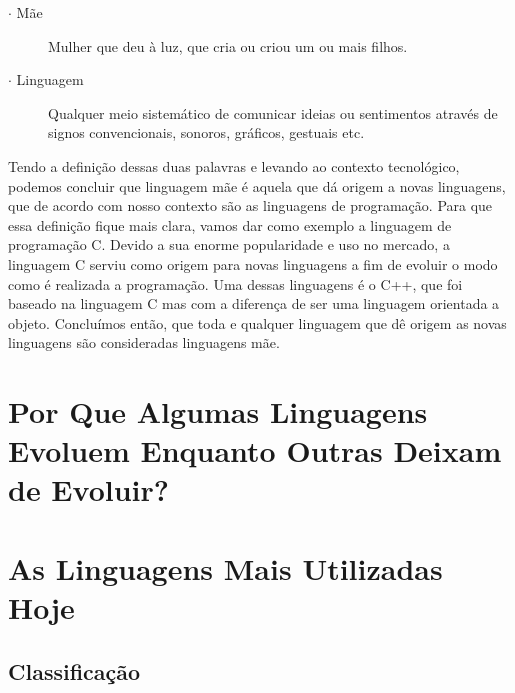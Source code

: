 \documentclass[
    12pt,               %
    openany,            %
    twoside,            %
    a4paper,            %
    brazil              %
    ]{abntex2}
\begin{document}
\begin{description} \item[$\cdot$ Mãe] Mulher que deu à luz, que cria ou criou
um ou mais filhos.  \item[$\cdot$ Linguagem] Qualquer meio sistemático de
comunicar ideias ou sentimentos através de signos convencionais, sonoros,
gráficos, gestuais etc.
\end{description}

Tendo a definição dessas duas palavras e levando ao contexto tecnológico,
podemos concluir que linguagem mãe é aquela que dá origem a novas linguagens,
que de acordo com nosso contexto são as linguagens de programação.  Para que
essa definição fique mais clara, vamos dar como exemplo a linguagem de
programação C. Devido a sua enorme popularidade e uso no mercado, a linguagem C
serviu como origem para novas linguagens a fim de evoluir o modo como é
realizada a programação. Uma dessas linguagens é o C++, que foi baseado na
linguagem C mas com a diferença de ser uma linguagem orientada a objeto.
Concluímos então, que toda e qualquer linguagem que dê origem as novas
linguagens são consideradas linguagens mãe.

\part{Por Que Algumas Linguagens Evoluem Enquanto Outras Deixam de Evoluir?}

\part{As Linguagens Mais Utilizadas Hoje}

\chapter{Classificação}
\end{document}
